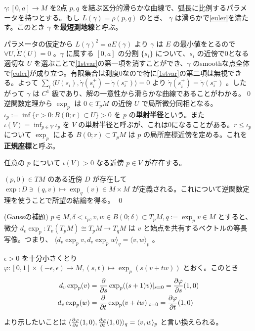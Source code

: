 \documentclass[dvipdfmx,a4paper]{jsreport}
\theoremstyle{definition}
\newcommand{\der}{\partial}
\renewcommand{\phi}{\varphi}
\begin{document}
\lem $\gamma:[0,a]\to M$ を2点 $p,q$ を結ぶ区分的滑らかな曲線で、弧長に比例するパラメータを持つとする。もし $L(\gamma)=\rho(p,q)$ のとき、 $\gamma$ は滑らかで\eqref{euler}を満たす。このとき $\gamma$ を\textbf{最短測地線}と呼ぶ。

\prf パラメータの仮定から $L(\gamma)^2=aE(\gamma)$ より $\gamma$ は $E$ の最小値をとるので $\forall U,\dot{E}(U)=0$ 。$\gamma$ に属する $[0,a]$ の分割 $\{s_i\}$ について、$s_i$ の近傍で0となる適切な $U$ を選ぶことで\eqref{1stvar}の第一項を消すことができ、$\gamma$ のsmoothな点全体で\eqref{euler}が成り立つ。有限集合は測度0なので特に\eqref{1stvar}の第二項は無視できる。よって $\sum_i \langle U(s_i),\dot{\gamma}(s_i^+)-\dot{\gamma}(s_i^-) \rangle=0$ より $\dot{\gamma}(s_i^+)=\dot{\gamma}(s_i^-)$ 。したがって $\gamma$ は $C^1$ 級であり、解の一意性から滑らかな曲線であることがわかる。\qed \\


逆関数定理から $\exp_p$ は $0 \in T_pM$ の近傍 $U$ で局所微分同相となる。$\iota_p:=\inf\{r>0 \colon B(0;r) \subset U\}>0$ を $p$ の\textbf{単射半径}という。また $\iota(V)=\inf_{p \in V} \iota_p$ を $V$ の単射半径と呼ぶが、これは0になることがある。$r \leq \iota_p$ について $\exp_p$ による $B(0;r) \subset T_pM$ は $p$ の局所座標近傍を定める。これを\textbf{正規座標}と呼ぶ。


\lem\label{lemrad} 任意の $p$ について $\iota(V)>0$ なる近傍 $p \in V$ が存在する。

\prf $(p,0) \in TM$ のある近傍 $D$ が存在して $\exp:D \ni (q,v) \mapsto \exp_q(v) \in M \times M$ が定義される。これについて逆関数定理を使うことで所望の結論を得る。 \qed


\lem\label{lemgauss} (Gaussの補題) $p \in M,\delta<\iota_p,v,w \in B(0;\delta) \subset T_pM,q:=\exp_p v \in M$ とすると、微分 $d_v\exp_p:T_v(T_pM) \cong T_pM \to T_qM$ は $v$ と始点を共有するベクトルの等長写像。つまり、 $\langle d_v\exp_p v,d_v\exp_p w \rangle_q=\langle v,w \rangle_p$ 。

\prf $\epsilon>0$ を十分小さくとり $\phi:[0,1] \times (-\epsilon,\epsilon) \to M,(s,t) \mapsto \exp_p(s(v+tw))$ とおく。このとき
\begin{align*}
    d_v \exp_p(v)&= {\der \over \der s}\exp_p((s+1)v)|_{s=0}={\der \phi \over \der s}(1,0) \\
    d_v \exp_p(w)&= {\der \over \der t}\exp_p(v+tw)|_{t=0}={\der \phi \over \der t}(1,0)
\end{align*}

より示したいことは $\langle {\der \phi \over \der s}(1,0),{\der \phi \over \der t}(1,0) \rangle_q=\langle v,w \rangle_p$ と言い換えられる。
\end{document}
